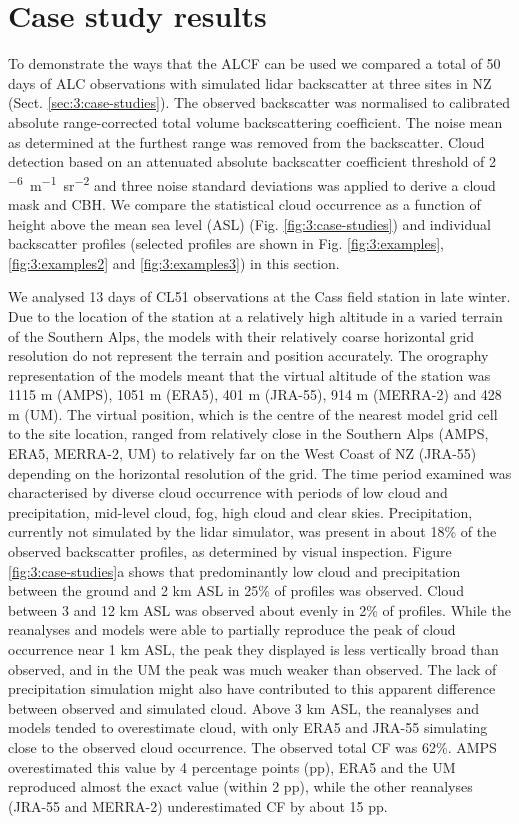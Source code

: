 \section{Case study results}
\label{sec:3:results}

To demonstrate the ways that the ALCF can be used we compared a total of 50 days of ALC observations with simulated lidar
backscatter at three sites in NZ (Sect. \ref{sec:3:case-studies}).
The observed backscatter was normalised to calibrated absolute range-corrected
total volume backscattering coefficient. The noise mean as determined at the
furthest range was removed from the backscatter. Cloud detection based on an
attenuated absolute backscatter coefficient threshold of 2 \unit{^{-6} m^{-1}sr^{-2}}
and three noise standard deviations was applied
to derive a cloud mask and CBH. We compare the statistical cloud occurrence
as a function of height above the mean sea level (ASL) (Fig.
\ref{fig:3:case-studies}) and individual backscatter profiles (selected
profiles are shown in Fig. \ref{fig:3:examples}, \ref{fig:3:examples2} and \ref{fig:3:examples3}) in this section.

We analysed 13 days of CL51 observations at the Cass field station in late
winter. Due to the location of the station at a relatively high altitude in a
varied terrain of the Southern Alps, the models with their
relatively coarse horizontal grid resolution do not represent the
terrain and position accurately. The orography representation of the models meant
that the virtual altitude of the station was 1115 m (AMPS), 1051 m (ERA5),
401 m (JRA-55), 914 m (MERRA-2) and  428 m (UM). The virtual position, which is the centre
of the nearest model grid cell to the site location, ranged from relatively
close in the Southern Alps (AMPS, ERA5, MERRA-2, UM) to relatively far on the West
Coast of NZ (JRA-55) depending on the horizontal resolution of the grid. The time period examined was characterised by diverse cloud
occurrence with periods of low cloud and precipitation, mid-level cloud,
fog, high cloud and clear skies. Precipitation, currently not simulated by the
lidar simulator, was present in about 18\% of the observed backscatter profiles,
as determined by visual inspection.
Figure \ref{fig:3:case-studies}a shows that predominantly low cloud and
precipitation between the ground and 2 km ASL in 25\% of
profiles was observed. Cloud between 3 and 12 km ASL was observed about
evenly in 2\% of profiles. While the reanalyses and models were able to partially
reproduce the peak of cloud occurrence near 1 km ASL, the peak they displayed is less vertically broad than observed,
and in the UM the peak was much weaker than observed.
The lack of precipitation simulation
might also have contributed to this apparent difference between observed and simulated
cloud. Above 3 km ASL, the reanalyses and models tended to overestimate cloud,
with only ERA5 and JRA-55 simulating close to the observed cloud occurrence.
The observed total CF was 62\%. AMPS overestimated this value by 4 percentage points (pp),
ERA5 and the UM reproduced almost the exact value (within 2 pp), while the other reanalyses (JRA-55 and MERRA-2)
underestimated CF by about 15 pp.

